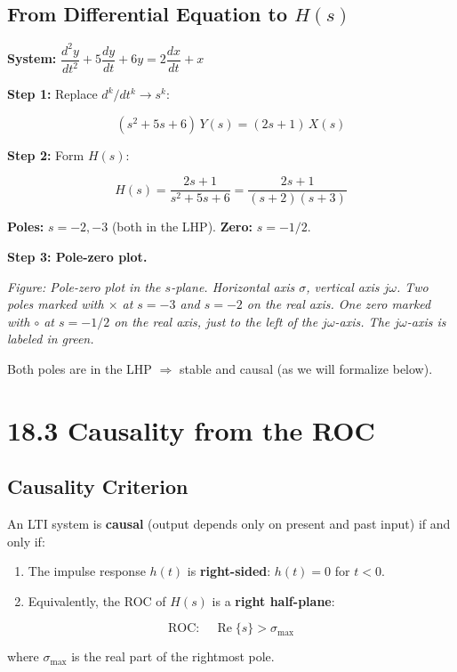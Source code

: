 \documentclass[11pt]{article}
\begin{document}
\subsection*{From Differential Equation to $H(s)$}

\textbf{System:} $\dfrac{d^2 y}{dt^2} + 5\dfrac{dy}{dt} + 6y = 2\dfrac{dx}{dt} + x$

\textbf{Step 1:} Replace $d^k/dt^k \to s^k$:

\[(s^2 + 5s + 6)\, Y(s) = (2s + 1)\, X(s)\]

\textbf{Step 2:} Form $H(s)$:

\[H(s) = \frac{2s + 1}{s^2 + 5s + 6} = \frac{2s + 1}{(s+2)(s+3)}\]

\textbf{Poles:} $s = -2, -3$ (both in the LHP). \textbf{Zero:} $s = -1/2$.

\textbf{Step 3: Pole-zero plot.}

\textit{Figure: Pole-zero plot in the $s$-plane. Horizontal axis $\sigma$, vertical axis $j\omega$. Two poles marked with $\times$ at $s = -3$ and $s = -2$ on the real axis. One zero marked with $\circ$ at $s = -1/2$ on the real axis, just to the left of the $j\omega$-axis. The $j\omega$-axis is labeled in green.}

Both poles are in the LHP $\Rightarrow$ stable and causal (as we will formalize below).

\section*{18.3 Causality from the ROC}

\subsection*{Causality Criterion}

An LTI system is \textbf{causal} (output depends only on present and past input) if and only if:

\begin{enumerate}
  \item The impulse response $h(t)$ is \textbf{right-sided}: $h(t) = 0$ for $t < 0$.
  \item Equivalently, the ROC of $H(s)$ is a \textbf{right half-plane}:
\end{enumerate}

\[\text{ROC}: \quad \operatorname{Re}\{s\} > \sigma_{\max}\]

where $\sigma_{\max}$ is the real part of the rightmost pole.
\end{document}
